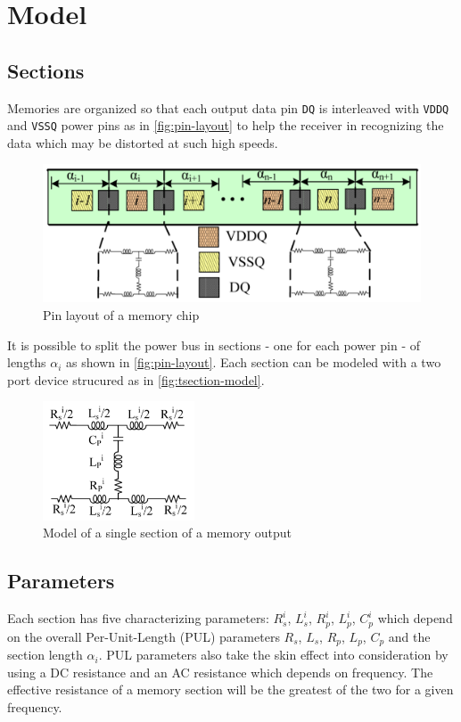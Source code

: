 \section{Model}
\subsection{Sections}
Memories are organized so that each output data pin \texttt{DQ} is interleaved with \texttt{VDDQ} and \texttt{VSSQ} power pins as in \autoref{fig:pin-layout} to help the receiver in recognizing the data which may be distorted at such high speeds.
\begin{figure}[htbp]
	\center
	\includegraphics[width = \textwidth]{img/pin-layout}
	\caption{Pin layout of a memory chip}
	\label{fig:pin-layout}
\end{figure}

It is possible to split the power bus in sections - one for each power pin - of lengths $\alpha_i$ as shown in \autoref{fig:pin-layout}. Each section can be modeled with a two port device strucured as in \autoref{fig:tsection-model}.
\begin{figure}[htbp]
	\center
	\includegraphics[width = 0.4\textwidth]{img/tsection-model}
	\caption{Model of a single section of a memory output}
	\label{fig:tsection-model}
\end{figure}

\subsection{Parameters}
\label{ssec:parameters}
Each section has five characterizing parameters: $R^i_s$, $L^i_s$, $R^i_p$, $L^i_p$, $C^i_p$ which depend on the overall Per-Unit-Length (PUL) parameters $R_s$, $L_s$, $R_p$, $L_p$, $C_p$ and the section length $\alpha_i$. PUL parameters also take the skin effect into consideration by using a DC resistance and an AC resistance which depends on frequency. The effective resistance of a memory section will be the greatest of the two for a given frequency.

